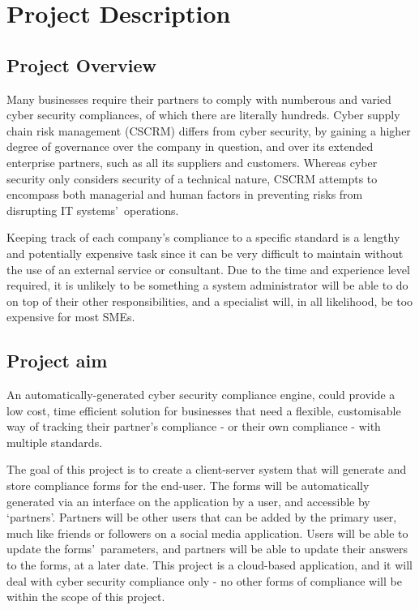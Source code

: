 \chapter{Project Description} \label{Chapter:one}
    \section{Project Overview}
        Many businesses require their partners to comply with numberous and varied cyber security compliances, of which there are literally hundreds. Cyber supply chain risk management (CSCRM) differs from cyber security, by gaining a higher degree of governance over the company in question, and over its extended enterprise partners, such as all its suppliers and customers. Whereas cyber security only considers security of a technical nature, CSCRM attempts to encompass both managerial and human factors in preventing risks from disrupting IT systems\textquoteright\ operations. \cite{CSCRM}
        
        Keeping track of each company\textquoteright s compliance to a specific standard is a lengthy and potentially expensive task since it can be very difficult to maintain without the use of an external service or consultant. Due to the time and experience level required, it is unlikely to be something a system administrator will be able to do on top of their other responsibilities, and a specialist will, in all likelihood, be too expensive for most SMEs.

    \section{Project aim}
        An automatically-generated cyber security compliance engine, could provide a low cost, time efficient solution for businesses that need a flexible, customisable way of tracking their partner\textquoteright s compliance - or their own compliance - with multiple standards.

        The goal of this project is to create a client-server system that will generate and store compliance forms for the end-user. The forms will be automatically generated via an interface on the application by a user, and accessible by \textquoteleft partners\textquoteright. Partners will be other users that can be added by the primary user, much like friends or followers on a social media application. Users will be able to update the forms\textquoteright\ parameters, and partners will be able to update their answers to the forms, at a later date. This project is a cloud-based application, and it will deal with cyber security compliance only - no other forms of compliance will be within the scope of this project.
